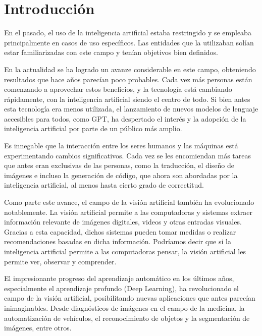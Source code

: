 \chapter*{Introducci\'on}\label{chapter:introduction}

En el pasado, el uso de la inteligencia artificial estaba restringido y se empleaba principalmente en casos de uso espec\'ificos. Las entidades que la utilizaban sol\'ian estar familiarizadas con este campo y ten\'ian objetivos bien definidos.

En la actualidad se ha logrado un avanze considerable en este campo, obteniendo resultados que hace años parec\'ian poco probables. Cada vez m\'as personas est\'an comenzando a aprovechar estos beneficios, y la tecnolog\'ia est\'a cambiando r\'apidamente, con la inteligencia artificial siendo el centro de todo. Si bien antes esta tecnolog\'ia era menos utilizada,  el lanzamiento de nuevos modelos de lenguaje accesibles para todos, como GPT, ha despertado el inter\'es y la adopci\'on de la inteligencia artificial por parte de un p\'ublico m\'as amplio.

Es innegable que la interacci\'on entre los seres humanos y las m\'aquinas est\'a experimentando cambios significativos. Cada vez se les encomiendan m\'as tareas que antes eran exclusivas de las personas, como la traducci\'on, el diseño de im\'agenes e incluso la generaci\'on de c\'odigo, que ahora son abordadas por la inteligencia artificial, al menos hasta cierto grado de correctitud.

Como parte este avance, el campo de la visi\'on artificial tambi\'en ha evolucionado notablemente. La visi\'on artificial permite a las computadoras y sistemas extraer informaci\'on relevante de im\'agenes digitales, videos y otras entradas visuales. Gracias a esta capacidad, dichos sistemas pueden tomar medidas o realizar recomendaciones basadas en dicha informaci\'on. Podr\'iamos decir que si la inteligencia artificial permite a las computadoras pensar, la visi\'on artificial les permite ver, observar y comprender.

El impresionante progreso del aprendizaje autom\'atico en los \'ultimos años, especialmente el aprendizaje profundo (Deep Learning), ha revolucionado el campo de la visi\'on artificial, posibilitando nuevas aplicaciones que antes parec\'ian inimaginables. Desde diagn\'osticos de im\'agenes en el campo de la medicina, la automatizaci\'on de veh\'iculos, el reconocimiento de objetos y la segmentaci\'on de im\'agenes, entre otros.

